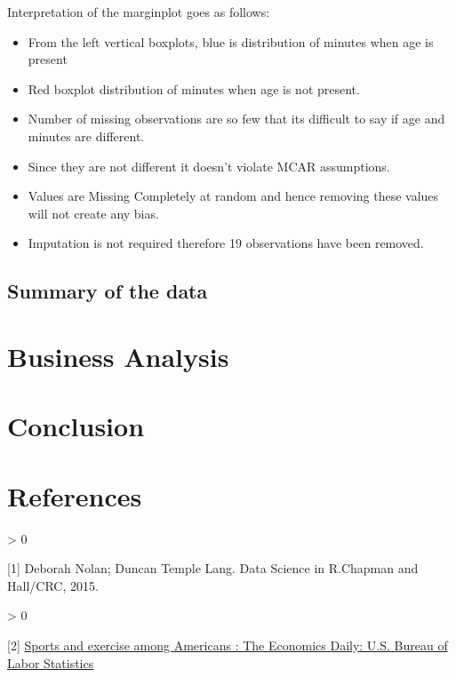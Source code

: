 \documentclass[
]{article}
\providecommand{\tightlist}{%
  \setlength{\itemsep}{0pt}\setlength{\parskip}{0pt}}
\newlength{\cslhangindent}
\newenvironment{CSLReferences}[2] %
 {%
  \setlength{\parindent}{0pt}
  \ifodd #1 \everypar{\setlength{\hangindent}{\cslhangindent}}\ignorespaces\fi
  \ifnum #2 > 0
  \setlength{\parskip}{#2\baselineskip}
  \fi
 }%
 {}
\begin{document}
Interpretation of the marginplot goes as follows:

\begin{itemize}
\tightlist
\item
  From the left vertical boxplots, blue is distribution of minutes when
  age is present
\item
  Red boxplot distribution of minutes when age is not present.
\item
  Number of missing observations are so few that its difficult to say if
  age and minutes are different.
\item
  Since they are not different it doesn't violate MCAR assumptions.
\item
  Values are Missing Completely at random and hence removing these
  values will not create any bias.
\item
  Imputation is not required therefore 19 observations have been
  removed.
\end{itemize}

\hypertarget{summary-of-the-data}{%
\subsection{Summary of the data}\label{summary-of-the-data}}

\newpage

\hypertarget{business-analysis}{%
\section{Business Analysis}\label{business-analysis}}

\newpage

\hypertarget{conclusion}{%
\section{Conclusion}\label{conclusion}}

\hypertarget{references}{%
\section*{References}\label{references}}

\leavevmode\hypertarget{refs}{}%
\begin{CSLReferences}{0}{0}
{[}1{]} Deborah Nolan; Duncan Temple Lang. Data Science in R.Chapman and
Hall/CRC, 2015.

\end{CSLReferences}

\leavevmode\hypertarget{refs}{}%
\begin{CSLReferences}{0}{0}
{[}2{]}
\href{https://www.bls.gov/opub/ted/2016/sports-and-exercise-among-americans.htm}{Sports
and exercise among Americans : The Economics Daily: U.S. Bureau of Labor
Statistics}

\end{CSLReferences}
\end{document}
